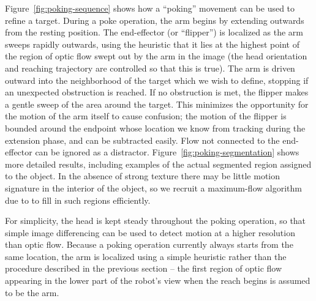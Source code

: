 Figure~\ref{fig:poking-sequence} shows how a ``poking'' movement can
be used to refine a target.  During a poke operation, the arm begins
by extending outwards from the resting position.  The end-effector (or
``flipper'') is localized as the arm sweeps rapidly outwards, using
the heuristic that it lies at the highest point of the region of optic
flow swept out by the arm in the image (the head orientation and
reaching trajectory are controlled so that this is true).  The arm is
driven outward into the neighborhood of the target which we wish to
define, stopping if an unexpected obstruction is reached.  If no
obstruction is met, the flipper makes a gentle sweep of the area
around the target.  This minimizes the opportunity for the motion of
the arm itself to cause confusion; the motion of the flipper is
bounded around the endpoint whose location we know from tracking
during the extension phase, and can be subtracted easily.  Flow not
connected to the end-effector can be ignored as a distractor.
Figure~\ref{fig:poking-segmentation} shows more detailed results,
including examples of the actual segmented region assigned to the
object.  In the absence of strong texture there may be little motion
signature in the interior of the object, so we recruit a maximum-flow
algorithm due to \cite{boykov01experimental} to fill in such regions
efficiently.

\ifverbose
For simplicity, the head is kept steady throughout the poking
operation, so that simple image differencing can be used to detect
motion at a higher resolution than optic flow.  Because a poking
operation currently always starts from the same location, the arm
is localized using a simple heuristic rather than the procedure described
in the previous section -- the first region of optic flow appearing
in the lower part of the robot's view when the reach begins
is assumed to be the arm.
\fi

